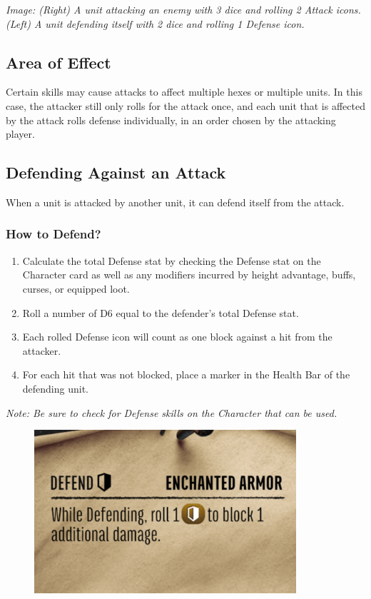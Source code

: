 \documentclass[../main.tex]{subfiles}
\begin{document}
\textit{Image: (Right) A unit attacking an enemy with 3 dice and rolling 2 Attack icons. (Left) A unit defending itself with 2 dice and rolling 1 Defense icon. }

\subsection{Area of Effect}
Certain skills may cause attacks to affect multiple hexes or multiple units. In this case, the attacker still only rolls for the attack once, and each unit that is affected by the attack rolls defense individually, in an order chosen by the attacking player.

\subsection{Defending Against an Attack}
When a unit is attacked by another unit, it can defend itself from the attack.

\subsubsection{How to Defend?}
\begin{enumerate}
    \item Calculate the total Defense stat by checking the Defense stat on the Character card as well as any modifiers incurred by height advantage, buffs, curses, or equipped loot.
    \item Roll a number of D6 equal to the defender’s total Defense stat.
    \item Each rolled Defense icon will count as one block against a hit from the attacker.
    \item For each hit that was not blocked, place a marker in the Health Bar of the defending unit. 
\end{enumerate}

\textit{Note: Be sure to check for Defense skills on the Character that can be used.}

\begin{figure}[h]
    \centering
    \includegraphics[width=0.5\linewidth]{chapters//TargetingandCombat/TimeStrikeDefenseSkills.png}
\end{figure}
\end{document}
